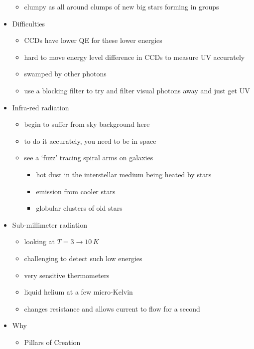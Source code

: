 \documentclass[a4paper,11pt,normalem]{article}
\begin{document}
\begin{itemize}
\begin{itemize}
            \item clumpy as all around clumps of new big stars forming in groups
        \end{itemize}
    \item Difficulties
        \begin{itemize}
            \item CCDs have lower QE for these lower energies
            \item hard to move energy level difference in CCDs to measure UV accurately
            \item swamped by other photons
            \item use a blocking filter to try and filter visual photons away and just get UV
        \end{itemize}
    \item Infra-red radiation
        \begin{itemize}
            \item begin to suffer from sky background here
            \item to do it accurately, you need to be in space
            \item see a `fuzz' tracing spiral arms on galaxies
                \begin{itemize}
                    \item hot dust in the interstellar medium being heated by stars
                    \item emission from cooler stars
                    \item globular clusters of old stars
                \end{itemize}
        \end{itemize}
    \item Sub-millimeter radiation
        \begin{itemize}
            \item looking at \(T = 3 \to 10 \, K\)
            \item challenging to detect such low energies
            \item very sensitive thermometers
            \item liquid helium at a few micro-Kelvin
            \item changes resistance and allows current to flow for a second
        \end{itemize}
    \item Why
        \begin{itemize}
            \item Pillars of Creation

\end{itemize}
\end{itemize}
\end{document}
